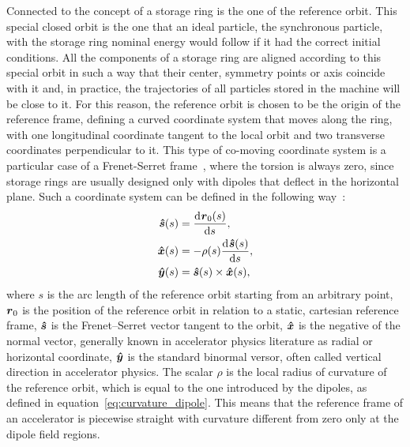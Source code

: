     Connected to the concept of a storage ring is the one of the reference orbit. This special closed orbit is the one that an ideal particle, the synchronous particle, with the storage ring nominal energy would follow if it had the correct initial conditions. All the components of a storage ring are aligned according to this special orbit in such a way that their center, symmetry points or axis coincide with it and, in practice, the trajectories of all particles stored in the machine will be close to it. For this reason, the reference orbit is chosen to be the origin of the reference frame, defining a curved coordinate system that moves along the ring, with one longitudinal coordinate tangent to the local orbit and two transverse coordinates perpendicular to it. This type of co-moving coordinate system is a particular case of a Frenet-Serret frame~\cite{Frenet1852,Serret1851,wiki2017}, where the torsion is always zero, since storage rings are usually designed only with dipoles that deflect in the horizontal plane. Such a coordinate system can be defined in the following way~\cite[chap. 2]{Lee1999}:
    \begin{align}\nonumber
        \boldsymbol{\hat s}(s) &= \frac{\mathrm{d}^{{}}\boldsymbol{r}_0(s)}{\mathrm{d} s^{{}}},\\
        \boldsymbol{\hat x}(s) &= -\rho(s)\frac{\mathrm{d}^{{}}\boldsymbol{\hat s}(s)}{\mathrm{d} s^{{}}},\\\nonumber
        \boldsymbol{\hat y}(s) &= \boldsymbol{\hat s}(s) \times \boldsymbol{\hat x}(s),
    \end{align}
    where $s$ is the arc length of the reference orbit starting from an arbitrary point, $\boldsymbol{r}_0$ is the position of the reference orbit in relation to a static, cartesian reference frame, $\boldsymbol{\hat s}$ is the Frenet--Serret vector tangent to the orbit, $\boldsymbol{\hat x}$ is the negative of the normal vector, generally known in accelerator physics literature as radial or horizontal coordinate, $\boldsymbol{\hat y}$ is the standard binormal versor, often called vertical direction in accelerator physics. The scalar $\rho$ is the local radius of curvature of the reference orbit, which is equal to the one introduced by the dipoles, as defined in equation~\eqref{eq:curvature_dipole}. This means that the reference frame of an accelerator is piecewise straight with curvature different from zero only at the dipole field regions.

